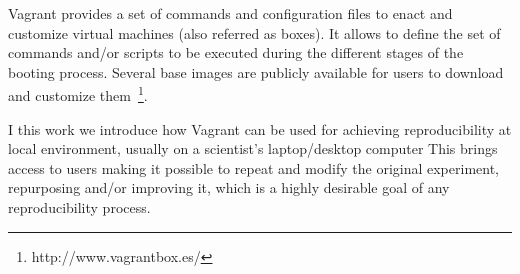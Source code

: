 Vagrant provides a set of commands and configuration files to enact and customize virtual machines
 (also referred as boxes). It allows to define the set of commands and/or scripts to be executed during 
 the different stages of the booting process. Several base images are publicly available for users to 
 download and customize them~\footnote{http://www.vagrantbox.es/}. 
 
 I this work we introduce how Vagrant can be used for achieving reproducibility at local environment, usually 
 on a scientist's laptop/desktop computer This brings access to users making it possible to repeat and modify 
 the original experiment, repurposing and/or improving it, which is a highly desirable goal of any reproducibility
 process.


